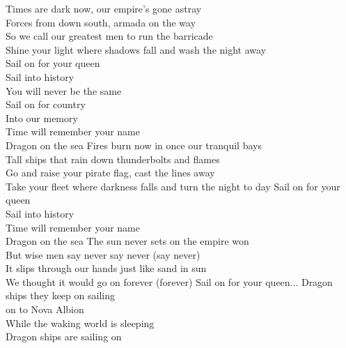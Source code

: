 Times are dark now, our empire's gone astray\\
Forces from down south, armada on the way\\
So we call our greatest men to run the barricade\\
Shine your light where shadows fall and wash the night away\\
\hops
{} Sail on for your queen\\
 Sail into history\\
 You will never be the same\\
 Sail on for country\\
 Into our memory\\
 Time will remember your name\\
 Dragon on the sea
\hops
Fires burn now in once our tranquil bays\\
Tall ships that rain down thunderbolts and flames\\
Go and raise your pirate flag, cast the lines away\\
Take your fleet where darkness falls and turn the night to day
\hops
{} Sail on for your queen\\
 Sail into history\\
 Time will remember your name\\
 Dragon on the sea
\hops
The sun never sets on the empire won\\
But wise men say never say never (say never)\\
It slips through our hands just like sand in sun\\
We thought it would go on forever (forever)
\hops
{} Sail on for your queen...
\hops
Dragon ships they keep on sailing\\
on to Nova Albion\\
While the waking world is sleeping\\
Dragon ships are sailing on